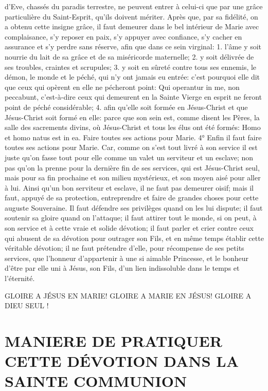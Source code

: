 d'Eve, chassés du paradis terrestre, ne peuvent entrer à celui-ci que par une grâce particulière du Saint-Esprit,
qu'ils doivent mériter.
 Après que, par sa fidélité, on a obtenu cette insigne grâce, il faut demeurer dans le bel intérieur de Marie
avec complaisance, s'y reposer en paix, s'y appuyer avec confiance, s'y cacher en assurance et s'y perdre sans
réserve, afin que dans ce sein virginal: 1. l'âme y soit nourrie du lait de sa grâce et de sa miséricorde maternelle; 2.
y soit délivrée de ses troubles, craintes et scrupules; 3. y soit en sûreté contre tous ses ennemis, le démon, le
monde et le péché, qui n'y ont jamais eu entrée: c'est pourquoi elle dit que ceux qui opèrent en elle ne pécheront
point: Qui operantur in me, non peccabunt, c'est-à-dire ceux qui demeurent en la Sainte Vierge en esprit ne feront
point de péché considérable; 4. afin qu'elle soit formée en Jésus-Christ et que Jésus-Christ soit formé en elle:
parce que son sein est, comme disent les Pères, la salle des sacrements divins, où Jésus-Christ et tous les élus
ont été formés: Homo et homo natus est in ea.
Faire toutes ses actions pour Marie.
 4° Enfin il faut faire toutes ses actions pour Marie. Car, comme on s'est tout livré à son service il est juste
qu'on fasse tout pour elle comme un valet un serviteur et un esclave; non pas qu'on la prenne pour la dernière fin
de ses services, qui est Jésus-Christ seul, mais pour sa fin prochaine et son milieu mystérieux, et son moyen aisé
pour aller à lui. Ainsi qu'un bon serviteur et esclave, il ne faut pas demeurer oisif; mais il faut, appuyé de sa
protection, entreprendre et faire de grandes choses pour cette auguste Souveraine. Il faut défendre ses privilèges
quand on les lui dispute; il faut soutenir sa gloire quand on l'attaque; il faut attirer tout le monde, si on peut, à son
service et à cette vraie et solide dévotion; il faut parler et crier contre ceux qui abusent de sa dévotion pour
outrager son Fils, et en même temps établir cette véritable dévotion; il ne faut prétendre d'elle, pour récompense
de ses petits services, que l'honneur d'appartenir à une si aimable Princesse, et le bonheur d'être par elle uni à
Jésus, son Fils, d'un lien indissoluble dans le temps et l'éternité.

GLOIRE A JÉSUS EN MARIE!
GLOIRE A MARIE EN JÉSUS!
GLOIRE A DIEU SEUL !

\section{MANIERE DE PRATIQUER CETTE DÉVOTION DANS LA SAINTE COMMUNION}

